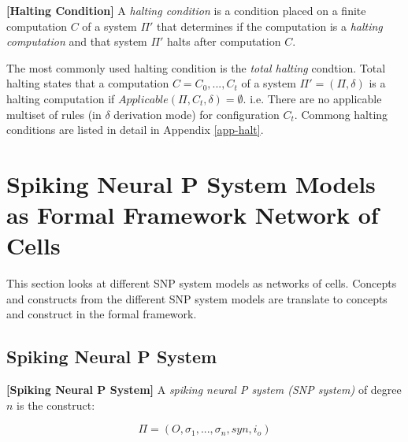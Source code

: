 \documentclass[a4paper]{article}
\theoremstyle{definition}
\begin{document}

\label{def-halt}\textbf{[Halting Condition]} A \emph{halting condition} is a condition
placed on a finite computation $C$ of a system $\Pi'$ that determines if the computation is a 
\emph{halting computation} and that system $\Pi'$ halts after computation $C$.

The most commonly used halting condition is the \emph{total halting} condtion. Total halting states
that a computation $C = C_0,...,C_t$ of a system $\Pi'=(\Pi,\delta)$ is a halting computation if 
$Applicable(\Pi,C_t,\delta) = \emptyset$. i.e. There are no applicable multiset of rules (in 
$\delta$ derivation mode) for configuration $C_t$. Commong halting conditions are listed in detail
in Appendix \ref{app-halt}.


\section{Spiking Neural P System Models as Formal Framework Network of Cells}\label{sec-snp}

This section looks at different SNP system models as networks of cells. Concepts and constructs from
the different SNP system models are translate to concepts and construct in the formal framework.  

\subsection{Spiking Neural P System}

\label{def-snp} \textbf{[Spiking Neural P System]} A \emph{spiking neural P system
(SNP system)} \cite{ionescu-2006-snp} of degree $n$ is the construct:

$$\Pi = (O, \sigma_1,...,\sigma_n,syn,i_o)$$
\end{document}
